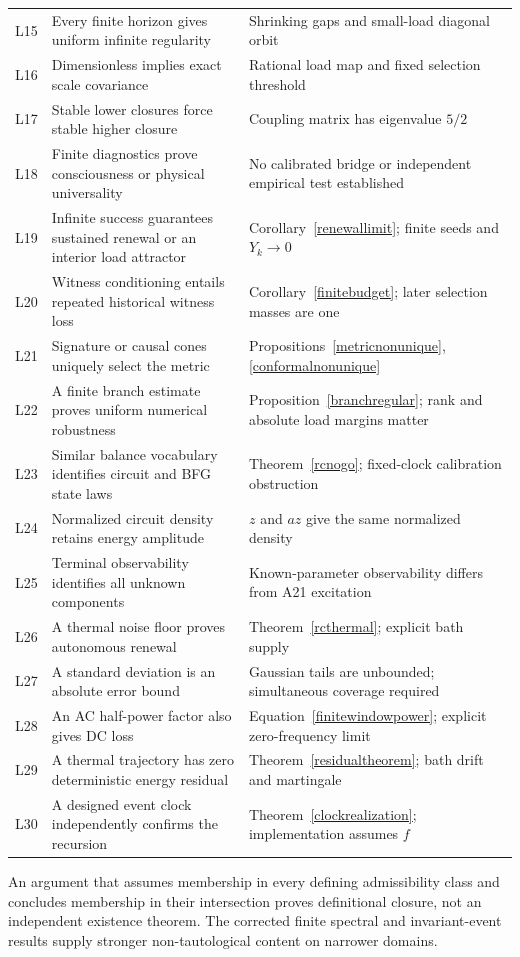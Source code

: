 \documentclass[11pt,letterpaper]{article}
\theoremstyle{definition}
\numberwithin{equation}{section}
\begin{document}
\begin{longtable}{p{}p{}p{}}
L15 & Every finite horizon gives uniform infinite regularity & Shrinking gaps and small-load diagonal orbit\\
L16 & Dimensionless implies exact scale covariance & Rational load map and fixed selection threshold\\
L17 & Stable lower closures force stable higher closure & Coupling matrix has eigenvalue $5/2$\\
L18 & Finite diagnostics prove consciousness or physical universality & No calibrated bridge or independent empirical test established\\
L19 & Infinite success guarantees sustained renewal or an interior load attractor & Corollary~\ref{renewallimit}; finite seeds and $Y_k\to0$\\
L20 & Witness conditioning entails repeated historical witness loss & Corollary~\ref{finitebudget}; later selection masses are one\\
L21 & Signature or causal cones uniquely select the metric & Propositions~\ref{metricnonunique}, \ref{conformalnonunique}\\
L22 & A finite branch estimate proves uniform numerical robustness & Proposition~\ref{branchregular}; rank and absolute load margins matter\\
L23 & Similar balance vocabulary identifies circuit and BFG state laws & Theorem~\ref{rcnogo}; fixed-clock calibration obstruction\\
L24 & Normalized circuit density retains energy amplitude & $z$ and $az$ give the same normalized density\\
L25 & Terminal observability identifies all unknown components & Known-parameter observability differs from A21 excitation\\
L26 & A thermal noise floor proves autonomous renewal & Theorem~\ref{rcthermal}; explicit bath supply\\
L27 & A standard deviation is an absolute error bound & Gaussian tails are unbounded; simultaneous coverage required\\
L28 & An AC half-power factor also gives DC loss & Equation~\ref{finitewindowpower}; explicit zero-frequency limit\\
L29 & A thermal trajectory has zero deterministic energy residual & Theorem~\ref{residualtheorem}; bath drift and martingale\\
L30 & A designed event clock independently confirms the recursion & Theorem~\ref{clockrealization}; implementation assumes $f$\\



\bottomrule
\end{longtable}
An argument that assumes membership in every defining admissibility class and concludes membership in their intersection proves definitional closure, not an independent existence theorem. The corrected finite spectral and invariant-event results supply stronger non-tautological content on narrower domains.
\end{document}
